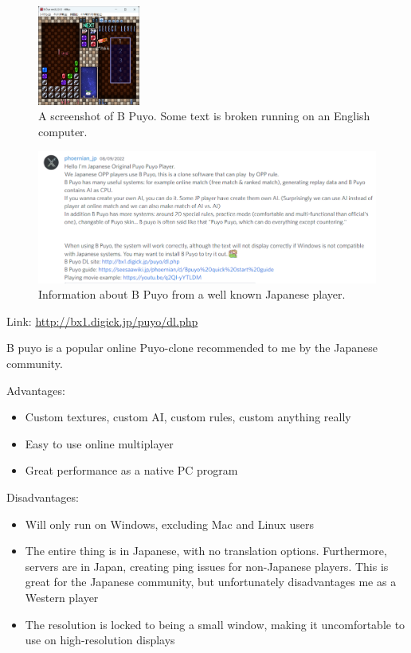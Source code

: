 \documentclass{article}
\begin{document}
\begin{figure}[h]
\centering
\includegraphics[width=0.3\textwidth]{bpuyo.png}
\caption{\label{fig:bpuyo}A screenshot of B Puyo. Some text is broken running on an English computer.}
\end{figure}
\begin{figure}[h]
\centering
\includegraphics[width=1\textwidth]{discord.png}
\caption{\label{fig:discord}Information about B Puyo from a well known Japanese player.}
\end{figure}
Link: \href{http://bx1.digick.jp/puyo/dl.php}{http://bx1.digick.jp/puyo/dl.php}

B puyo is a popular online Puyo-clone recommended to me by the Japanese community.
\vspace{0.3cm}

Advantages:

\begin{itemize}
    \renewcommand\labelitemi{--}
    \item Custom textures, custom AI, custom rules, custom anything really
    \item Easy to use online multiplayer
    \item Great performance as a native PC program

\end{itemize}

\vspace{3cm}

Disadvantages: 

\begin{itemize}
    \renewcommand\labelitemi{--}
    \item Will only run on Windows, excluding Mac and Linux users
    \item The entire thing is in Japanese, with no translation options. Furthermore, servers are in Japan, creating ping issues for non-Japanese players. This is great for the Japanese community, but unfortunately disadvantages me as a Western player
    \item The resolution is locked to being a small window, making it uncomfortable to use on high-resolution displays
\end{itemize}
\end{document}
